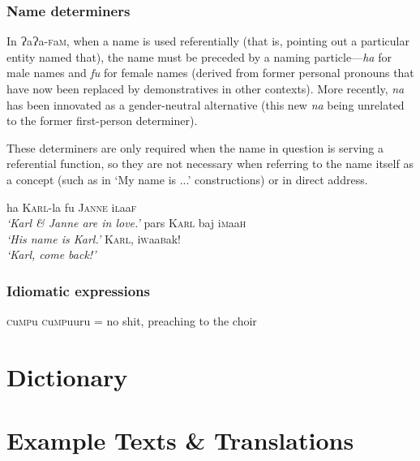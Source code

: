 \documentclass[a4paper,10pt,twoside,openright]{memoir}
\newcommand{\lang}{{\bigglot}a{\bigglot}a-\textsc{f}a\textsc{m}}
\newcommand{\bigglot}{Ɂ}
\newcommand{\famwordold}[5]{#1\textsc{#2}#3\textsc{#4}#5}
\begin{document}
\section{Name determiners}

In \lang{}, when a name is used referentially (that is, pointing out a particular entity named that), the name must be preceded by a naming particle---\textit{ha} for male names and \textit{fu} for female names (derived from former personal pronouns that have now been replaced by demonstratives in other contexts). More recently, \textit{na} has been innovated as a gender-neutral alternative (this new \textit{na} being unrelated to the former first-person determiner).

These determiners are only required when the name in question is serving a referential function, so they are not necessary when referring to the name itself as a concept (such as in `My name is ...' constructions) or in direct address.

\pex
\a
ha \textsc{Karl}-la fu \textsc{Janne} \famwordold{i}{l}{aa}{f}{}\\
\textit{`Karl \& Janne are in love.'}
\a
pars \textsc{Karl} baj \famwordold{i}{m}{aa}{h}{}\\
\textit{`His name is Karl.'}
\a
\textsc{Karl}, \famwordold{i}{w}{aa}{b}{ak}!\\
\textit{`Karl, come back!'}
\xe


\section{Idiomatic expressions}

\famwordold{}{c}{u}{mp}{u} \famwordold{}{c}{u}{mp}{uuru} = no shit, preaching to the choir

\part{Dictionary}



\part{Example Texts \& Translations}

\end{document}
